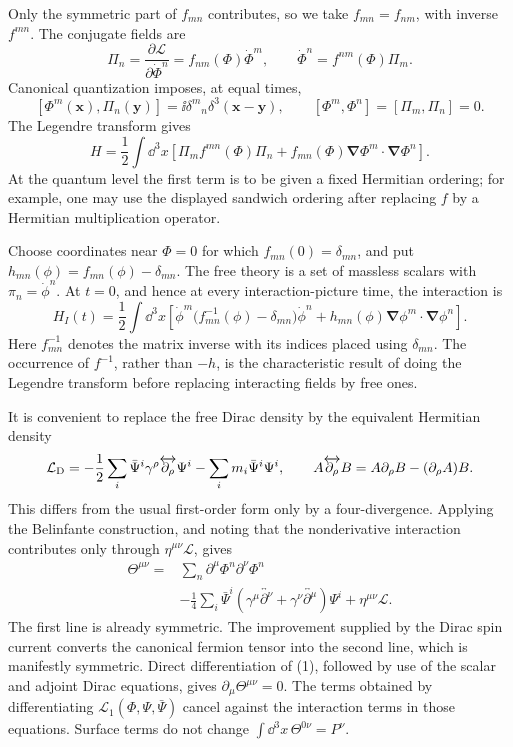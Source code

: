 \ExerciseEditorialNote

\begin{enumerate}
Only the symmetric part of \(f_{mn}\) contributes, so we take
\(f_{mn}=f_{nm}\), with inverse \(f^{mn}\).  The conjugate fields are
\[
 \Pi_n=\frac{\partial\mathcal L}{\partial\dot\Phi^n}
       =f_{nm}(\Phi)\dot\Phi^m ,
 \qquad
 \dot\Phi^n=f^{nm}(\Phi)\Pi_m .
\]
Canonical quantization imposes, at equal times,
\[
 [\Phi^m(\mathbf x),\Pi_n(\mathbf y)]
 =\ii\delta^m{}_n\delta^3(\mathbf x-\mathbf y),\qquad
 [\Phi^m,\Phi^n]=[\Pi_m,\Pi_n]=0 .
\]
The Legendre transform gives
\[
 H=\frac12\int \dd^3x\left[
 \Pi_m f^{mn}(\Phi)\Pi_n+
 f_{mn}(\Phi)\boldsymbol\nabla\Phi^m\mathbin{\cdot}
                       \boldsymbol\nabla\Phi^n\right].
\]
At the quantum level the first term is to be given a fixed Hermitian
ordering; for example, one may use the displayed sandwich ordering after
replacing \(f\) by a Hermitian multiplication operator.

Choose coordinates near \(\Phi=0\) for which \(f_{mn}(0)=\delta_{mn}\),
and put \(h_{mn}(\phi)=f_{mn}(\phi)-\delta_{mn}\).  The free theory is a
set of massless scalars with \(\pi_n=\dot\phi^n\).  At \(t=0\), and hence
at every interaction-picture time, the interaction is
\[
 \boxed{\;
 H_I(t)=\frac12\int \dd^3x\left[
 \dot\phi^m\bigl(f^{-1}_{mn}(\phi)-\delta_{mn}\bigr)\dot\phi^n
 +
 h_{mn}(\phi)\boldsymbol\nabla\phi^m\mathbin{\cdot}
                    \boldsymbol\nabla\phi^n\right].\;}
\]
Here \(f^{-1}_{mn}\) denotes the matrix inverse with its indices placed
using \(\delta_{mn}\).  The occurrence of \(f^{-1}\), rather than
\(-h\), is the characteristic result of doing the Legendre transform
before replacing interacting fields by free ones.

It is convenient to replace the free Dirac density by the equivalent
Hermitian density
\[
 \mathcal L_{\rm D}
 =-\frac12\sum_i\bar\Psi^i\gamma^\rho
       \overleftrightarrow{\partial_\rho}\Psi^i
  -\sum_i m_i\bar\Psi^i\Psi^i ,
 \qquad
 A\overleftrightarrow{\partial_\rho}B
 =A\partial_\rho B-(\partial_\rho A)B .
\]
This differs from the usual first-order form only by a four-divergence.
Applying the Belinfante construction, and noting that the nonderivative
interaction contributes only through \(\eta^{\mu\nu}\mathcal L\), gives
\[
 \boxed{\begin{aligned}
 \Theta^{\mu\nu}={}&
 \sum_n\partial^\mu\Phi^n\partial^\nu\Phi^n\\
 &-\frac14\sum_i\bar\Psi^i\left(
 \gamma^\mu\overleftrightarrow{\partial^\nu}
 +\gamma^\nu\overleftrightarrow{\partial^\mu}\right)\Psi^i
 +\eta^{\mu\nu}\mathcal L .
 \end{aligned}}\tag{1}
\]
The first line is already symmetric.  The improvement supplied by the
Dirac spin current converts the canonical fermion tensor into the second
line, which is manifestly symmetric.  Direct differentiation of (1),
followed by use of the scalar and adjoint Dirac equations, gives
\(\partial_\mu\Theta^{\mu\nu}=0\).  The terms obtained by differentiating
\(\mathcal L_1(\Phi,\Psi,\bar\Psi)\) cancel against the interaction terms
in those equations.  Surface terms do not change
\(\int \dd^3x\,\Theta^{0\nu}=P^\nu\).


\end{enumerate}
